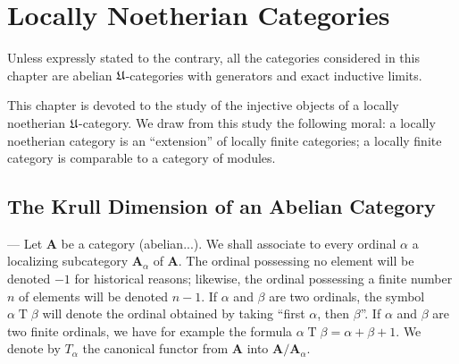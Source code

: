 %
%
%

\chapter{Locally Noetherian Categories}

Unless expressly stated to the contrary, all the categories considered
in this chapter are abelian $\mathfrak{U}$-categories with generators and
exact inductive limits.

This chapter is devoted to the study of the injective objects of a
locally noetherian $\mathfrak{U}$-category. We draw from this study the
following moral: a locally noetherian category is an ``extension'' of
locally finite categories; a locally finite category is comparable to
a category of modules.

\section{The Krull Dimension of an Abelian Category}

--- Let $\mathbf{A}$ be a category (abelian...). We shall associate to
every ordinal $\alpha$ a localizing subcategory $\mathbf{A}_\alpha$ of
$\mathbf{A}$. The ordinal possessing no element will be denoted $-1$
for historical reasons; likewise, the ordinal possessing a finite
number $n$ of elements will be denoted $n-1$. If $\alpha$ and $\beta$
are two ordinals, the symbol $\alpha \mathbin{T} \beta$ will denote the
ordinal obtained by taking ``first $\alpha$, then $\beta$''. If
$\alpha$ and $\beta$ are two finite ordinals, we have for example the
formula $\alpha \mathbin{T} \beta = \alpha + \beta + 1$. We denote by
$T_\alpha$ the canonical functor from $\mathbf{A}$ into
$\mathbf{A}/\mathbf{A}_\alpha$.

